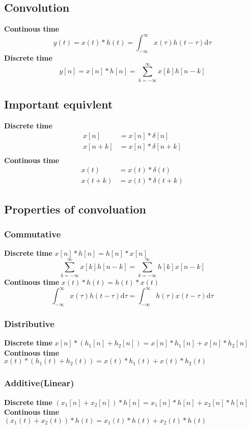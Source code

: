 \documentclass[12pt, a4paper]{article}
\begin{document}
\subsection*{Convolution}
\textbf{Continous time}
$$
y(t) = x(t)*h(t) = \int_{-\infty}^{\infty} x(\tau)h(t-\tau)\text{d}\tau
$$
\textbf{Discrete time}
$$
y[n] = x[n]*h[n] = \sum_{k=-\infty}^{\infty} x[k]h[n-k]
$$
\subsection*{Important equivlent}
\textbf{Discrete time}
\begin{align*}
	x[n] &= x[n]*\delta[n] \\
	x[n+k] &= x[n]*\delta[n+k] \\
\end{align*}
\textbf{Continous time}
\begin{align*}
	x(t) &= x(t)*\delta(t) \\
	x(t+k) &= x(t)*\delta(t+k)
\end{align*}


\subsection*{Properties of convoluation}
\subsubsection*{Commutative}
\textbf{Discrete time} $x[n]*h[n] = h[n]*x[n]$
$$
\sum_{k=-\infty}^{\infty} x[k]h[n-k] = \sum_{k=-\infty}^{\infty} h[k]x[n-k]
$$
\textbf{Continous time} $x(t)*h(t) = h(t)*x(t)$
$$
\int_{-\infty}^{\infty} x(\tau)h(t-\tau)\text{d}\tau = \int_{-\infty}^{\infty} h(\tau)x(t-\tau)\text{d}\tau
$$

\subsubsection*{Distributive}
\textbf{Discrete time} $x[n]*(h_1[n] + h_2[n]) = x[n]*h_1[n] + x[n]*h_2[n]$ \\
\textbf{Continous time} $x(t)*(h_1(t) + h_2(t)) = x(t)*h_1(t) + x(t)*h_2(t)$

\subsubsection*{Additive(Linear)}
\textbf{Discrete time} $(x_1[n]+x_2[n])*h[n] = x_1[n]*h[n] + x_2[n]*h[n]$ \\
\textbf{Continous time} $(x_1(t)+x_2(t))*h(t) = x_1(t)*h(t) + x_2(t)*h(t)$
\end{document}
